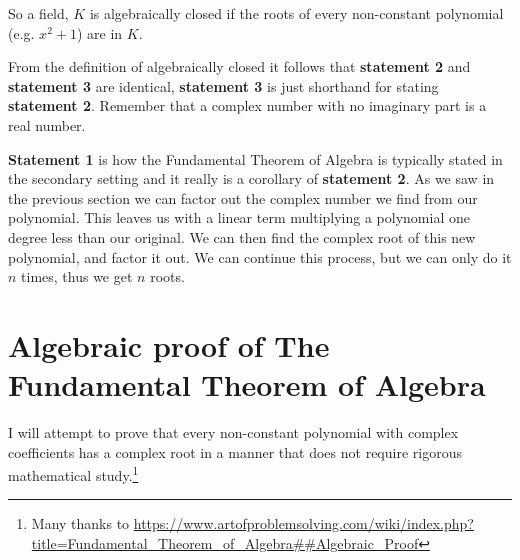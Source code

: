 \documentclass[12pt]{article}
\begin{document}
So a field, $K$ is algebraically closed if the roots of every non-constant polynomial (e.g. $x^2+1$) are in $K$.


From the definition of algebraically closed it follows that \textbf{statement 2} and \textbf{statement 3} are identical, \textbf{statement 3} is just shorthand for stating \textbf{statement 2}.  Remember that a complex number with no imaginary part is a real number.

\textbf{Statement 1} is how the Fundamental Theorem of Algebra is typically stated in the secondary setting and it really is a corollary of \textbf{statement 2}.  As we saw in the previous section we can factor out the complex number we find from our polynomial.  This leaves us with a linear term multiplying a polynomial one degree less than our original.  We can then find the complex root of this new polynomial, and factor it out.  We can continue this process, but we can only do it $n$ times, thus we get $n$ roots.


\section*{Algebraic proof of The Fundamental Theorem of Algebra}
I will attempt to prove that every non-constant polynomial with complex coefficients has a complex root in a manner that does not require rigorous mathematical study.\footnote{Many thanks to \url{https://www.artofproblemsolving.com/wiki/index.php?title=Fundamental_Theorem_of_Algebra##Algebraic_Proof}}\\

%
\end{document}
